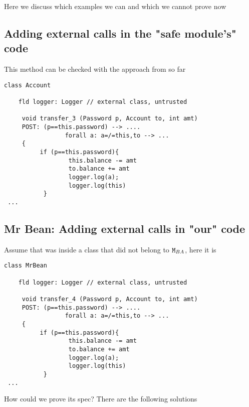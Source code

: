 Here we discuss which examples we can and which we cannot prove now

\subsection{Adding external calls in the "safe module's" code}

This method  can be checked with the approach from so far

\begin{lstlisting}[language=chainmail, mathescape=true, frame=lines]
class Account

    fld logger: Logger // external class, untrusted

     void transfer_3 (Password p, Account to, int amt) 
     POST: (p==this.password) --> ....
                 forall a: a=/=this,to --> ...
     {
          if (p==this.password){
                  this.balance -= amt
                  to.balance += amt
                  logger.log(a);
                  logger.log(this)
           }
 ...
\end{lstlisting}

\subsection{Mr Bean: Adding external calls in "our" code}

Assume that  was inside a class that did not belong to ${\texttt{M}}{_{BA}}$, here it is  

\begin{lstlisting}[language=chainmail, mathescape=true, frame=lines]
class MrBean

    fld logger: Logger // external class, untrusted

     void transfer_4 (Password p, Account to, int amt) 
     POST: (p==this.password) --> ....
                 forall a: a=/=this,to --> ...
     {
          if (p==this.password){
                  this.balance -= amt
                  to.balance += amt
                  logger.log(a);
                  logger.log(this)
           }
 ...
\end{lstlisting}

How could we prove its spec? There are the following solutions

